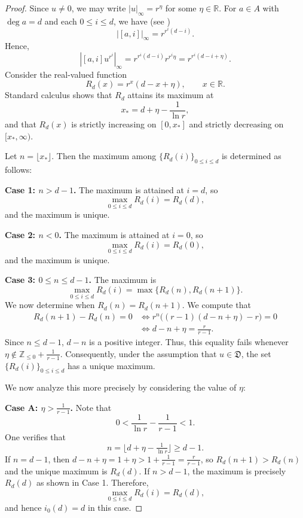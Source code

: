 \documentclass[12pt,reqno]{amsart}
\numberwithin{equation}{section}
\theoremstyle{plain}
\theoremstyle{definition}
\theoremstyle{remark}
\begin{document}
\begin{proof}
    Since $u\neq 0$, we may write $|u|_\infty=r^{\eta}$ for some $\eta \in \mathbb{R}$. For $a\in A$ with $\deg a=d$ and each $0\le i\le d$, we have (see \cite[Proposition 12.11]{Rosen2002})
    \[
        |[a,i]|_\infty = r^{r^i(d-i)}.
    \]
    Hence,
    \[
        |[a,i]u^{r^i}|_\infty 
        = r^{r^i(d-i)} r^{r^i\eta}
        = r^{r^i(d-i+\eta)} .
    \]
    Consider the real-valued function
    \[
        R_d(x) = r^{x}(d-x+\eta),\qquad x\in\mathbb{R}.
    \]
    Standard calculus shows that $R_d$ attains its maximum at
    \[
        x_* = d+\eta - \frac{1}{\ln r},
    \]
    and that $R_d(x)$ is strictly increasing on $[0,x_*]$ and strictly decreasing on $[x_*,\infty)$.  

    Let $n=\lfloor x_* \rfloor$. Then the maximum among $\{R_d(i)\}_{0\le i\le d}$ is determined as follows:

    \textbf{Case 1: $n> d-1$.} The maximum is attained at $i=d$, so
    \[
        \max_{0\le i\le d} R_d(i) = R_d(d),
    \]
    and the maximum is unique.

    \textbf{Case 2: $n< 0$.} The maximum is attained at $i=0$, so
    \[
        \max_{0\le i\le d} R_d(i) = R_d(0),
    \]
    and the maximum is unique.
    
    \textbf{Case 3: $0\leq n\le d-1$.} The maximum is 
    \[
        \max_{0\le i\le d} R_d(i) = \max\{R_d(n), R_d(n+1)\}.
    \]
    We now determine when $R_d(n)=R_d(n+1)$.  
    We compute that
    \begin{align*}
        R_d(n+1)-R_d(n)=0 &\iff
        r^{n}\bigl((r-1)(d-n+\eta)-r\bigr)=0 \\
        &\iff
        d-n+\eta = \frac{r}{r-1}.
    \end{align*}
    Since $n\leq d-1$, $d-n$ is a positive integer. Thus, this equality fails whenever 
    $\eta\notin \mathbb{Z}_{\le 0}+\frac{1}{r-1}$.  
    Consequently, under the assumption that $u \in \mathfrak{D}$, the set $\{R_d(i)\}_{0\le i\le d}$ has a unique maximum.

    We now analyze this more precisely by considering the value of $\eta$:

    \textbf{Case A: $\eta>\frac{1}{r-1}$.} Note that $$0<\frac{1}{\ln r}-\frac{1}{r-1}<1.$$ One verifies that 
    \[
        n=\lfloor d+\eta - \tfrac{1}{\ln r}\rfloor \ge d-1.
    \]
    If $n=d-1$, then $d-n+\eta = 1+\eta > 1+\frac{1}{r-1} = \frac{r}{r-1}$, so 
    $R_d(n+1)>R_d(n)$ and the unique maximum is $R_d(d)$.  
    If $n>d-1$, the maximum is precisely $R_d(d)$ as shown in Case 1.  
    Therefore,
    \[
        \max_{0\le i\le d} R_d(i)=R_d(d),
    \]
    and hence $i_0(d)=d$ in this case.


\end{proof}
\end{document}
